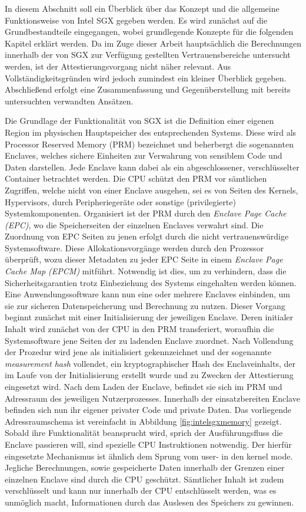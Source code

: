In diesem Abschnitt soll ein Überblick über das Konzept und die allgemeine Funktionsweise von Intel SGX gegeben werden. Es wird zunächst auf die Grundbestandteile eingegangen, wobei grundlegende Konzepte für die folgenden Kapitel erklärt werden. Da im Zuge dieser Arbeit hauptsächlich die Berechnungen innerhalb der von SGX zur Verfügung gestellten Vertrauensbereiche untersucht werden, ist der Attestierungsvorgang nicht näher relevant. Aus Vollständigkeitsgründen wird jedoch zumindest ein kleiner Überblick gegeben. Abschließend erfolgt eine Zusammenfassung und Gegenüberstellung mit bereits untersuchten verwandten Ansätzen.

Die Grundlage der Funktionalität von SGX ist die Definition einer eigenen Region im physischen Hauptspeicher des entsprechenden Systems. Diese wird als Processor Reserved Memory (PRM) bezeichnet und beherbergt die sogenannten Enclaves, welches sichere Einheiten zur Verwahrung von sensiblem Code und Daten darstellen. Jede Enclave kann dabei als ein abgeschlossener, verschlüsselter Container betrachtet werden. Die CPU schützt den PRM vor sämtlichen Zugriffen, welche nicht von einer Enclave ausgehen, sei es von Seiten des Kernels, Hypervisors, durch Peripheriegeräte oder sonstige (privilegierte) Systemkomponenten. Organisiert ist der PRM durch den \textit{Enclave Page Cache (EPC)}, wo die Speicherseiten der einzelnen Enclaves verwahrt sind. Die Zuordnung von EPC Seiten zu jenen erfolgt durch die nicht vertrauenswürdige Systemsoftware. Diese Allokationsvorgänge werden durch den Prozessor überprüft, wozu dieser Metadaten zu jeder EPC Seite in einem \textit{Enclave Page Cache Map (EPCM)} mitführt. Notwendig ist dies, um zu verhindern, dass die Sicherheitsgarantien trotz Einbeziehung des Systems eingehalten werden können. Eine Anwendungssoftware kann nun eine oder mehrere Enclaves einbinden, um sie zur sicheren Datenspeicherung und Berechnung zu nutzen. Dieser Vorgang beginnt zunächst mit einer Initialisierung der jeweiligen Enclave. Deren initialer Inhalt wird zunächst von der CPU in den PRM transferiert, woraufhin die Systemsoftware jene Seiten der zu ladenden Enclave zuordnet. Nach Vollendung der Prozedur wird jene als initialisiert gekennzeichnet und der sogenannte \textit{measurement hash} vollendet, ein kryptographischer Hash des Enclaveinhalts, der im Laufe von der Initialisierung erstellt wurde und zu Zwecken der Attestierung eingesetzt wird. Nach dem Laden der Enclave, befindet sie sich im PRM und Adressraum des jeweiligen Nutzerprozesses. Innerhalb der einsatzbereiten Enclave befinden sich nun ihr eigener privater Code und private Daten. Das vorliegende Adressraumschema ist vereinfacht in Abbildung \ref{fig:intelsgxmemory} gezeigt. Sobald ihre Funktionalität beansprucht wird, sprich der Ausführungsfluss die Enclave passieren will, sind spezielle CPU Instruktionen notwendig. Der hierfür eingesetzte Mechanismus ist ähnlich dem Sprung vom user- in den kernel mode. Jegliche Berechnungen, sowie gespeicherte Daten innerhalb der Grenzen einer einzelnen Enclave sind durch die CPU geschützt. Sämtlicher Inhalt ist zudem verschlüsselt und kann nur innerhalb der CPU entschlüsselt werden, was es unmöglich macht, Informationen durch das Auslesen des Speichers zu gewinnen.


